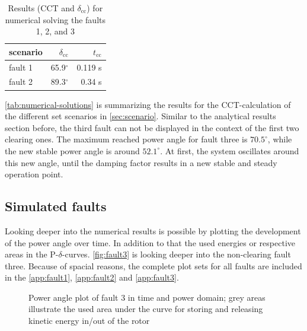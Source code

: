 \begin{table}
        \vspace{-12pt}
        \small
        \centering
        \caption[Numerical results for \acs{CCT}-calculations]{Results (\acs{CCT} and $\delta_\mathrm{cc}$) for numerical solving the faults 1, 2, and 3}
        \label{tab:numerical-solutions}
        \vspace{12pt}
        \begin{tabular}{|l|r|r|}
                \hline
                \rowcolor{lightgray} scenario & $\delta_\mathrm{cc}$ & $t_\mathrm{cc}$ \\ \hline \hline
                fault 1                       & 65.9$^\circ$          & 0.119 s                     \\ \hline
                fault 2                       & 89.3$^\circ$          & 0.34 s                     \\ \hline
        \end{tabular}
\end{table}
\autoref{tab:numerical-solutions} is summarizing the results for the \acs{CCT}-calculation of the different set scenarios in \autoref{sec:scenario}. Similar to the analytical results section before, the third fault can not be displayed in the context of the first two clearing ones. The maximum reached power angle for fault three is $70.5^\circ$, while the new stable power angle is around $52.1^\circ$. At first, the system oscillates around this new angle, until the damping factor results in a new stable and steady operation point.

\subsection{Simulated faults}

Looking deeper into the numerical results is possible by plotting the development of the power angle over time. In addition to that the used energies or respective areas in the P-$\delta$-curves. \autoref{fig:fault3} is looking deeper into the non-clearing fault three. Because of spacial reasons, the complete plot sets for all faults are included in the \autoref{app:fault1}, \autoref{app:fault2} and \autoref{app:fault3}.

\begin{figure}[H]
        \centering
        
        \caption[Power angle plot of fault 3]{Power angle plot of fault 3 in time and power domain; grey areas illustrate the used area under the curve for storing and releasing kinetic energy in/out of the rotor}
        \label{fig:fault3}
\end{figure}

